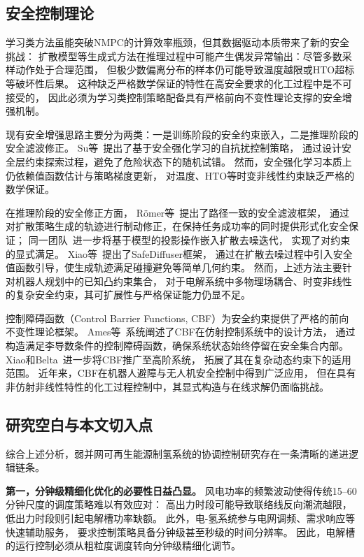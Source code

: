 \subsection{安全控制理论}

学习类方法虽能突破NMPC的计算效率瓶颈，但其数据驱动本质带来了新的安全挑战：
扩散模型等生成式方法在推理过程中可能产生偶发异常输出：尽管多数采样动作处于合理范围，
但极少数偏离分布的样本仍可能导致温度越限或HTO超标等破坏性后果。
这种缺乏严格数学保证的特性在高安全要求的化工过程中是不可接受的，
因此必须为学习类控制策略配备具有严格前向不变性理论支撑的安全增强机制。

现有安全增强思路主要分为两类：一是训练阶段的安全约束嵌入，二是推理阶段的安全滤波修正。
Su等~\cite{Su2026IJHE}提出了基于安全强化学习的自抗扰控制策略，
通过设计安全层约束探索过程，避免了危险状态下的随机试错。
然而，安全强化学习本质上仍依赖值函数估计与策略梯度更新，
对温度、HTO等时变非线性约束缺乏严格的数学保证。

在推理阶段的安全修正方面，
R{\"o}mer等~\cite{Roemer2025PACS}提出了路径一致的安全滤波框架，
通过对扩散策略生成的轨迹进行制动修正，在保持任务成功率的同时提供形式化安全保证；
同一团队~\cite{Roemer2025DPCC}进一步将基于模型的投影操作嵌入扩散去噪迭代，
实现了对约束的显式满足。
Xiao等~\cite{Xiao2023SafeDiffuser}提出了SafeDiffuser框架，
通过在扩散去噪过程中引入安全值函数引导，使生成轨迹满足碰撞避免等简单几何约束。
然而，上述方法主要针对机器人规划中的已知凸约束集合，
对于电解系统中多物理场耦合、时变非线性的复杂安全约束，其可扩展性与严格保证能力仍显不足。

控制障碍函数（Control Barrier Functions, CBF）为安全约束提供了严格的前向不变性理论框架。
Ames等~\cite{Ames2019CBF}系统阐述了CBF在仿射控制系统中的设计方法，
通过构造满足李导数条件的控制障碍函数，确保系统状态始终停留在安全集合内部。
Xiao和Belta~\cite{Xiao2022HOCBF}进一步将CBF推广至高阶系统，
拓展了其在复杂动态约束下的适用范围。
近年来，CBF在机器人避障与无人机安全控制中得到广泛应用，
但在具有非仿射非线性特性的化工过程控制中，其显式构造与在线求解仍面临挑战。

\subsection{研究空白与本文切入点}

综合上述分析，弱并网可再生能源制氢系统的协调控制研究存在一条清晰的递进逻辑链条。

\textbf{第一，分钟级精细化优化的必要性日益凸显。}
风电功率的频繁波动使得传统15--60分钟尺度的调度策略难以有效应对：
高出力时段可能导致联络线反向潮流越限，低出力时段则引起电解槽功率缺额。
此外，电-氢系统参与电网调频、需求响应等快速辅助服务，
要求控制策略具备分钟级甚至秒级的时间分辨率。
因此，电解槽的运行控制必须从粗粒度调度转向分钟级精细化调节。

